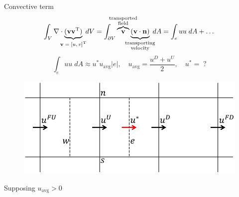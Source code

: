 \documentclass{beamer}
\begin{document}
\begin{frame}{Convective term}
\vspace{-0.5cm}
\begin{equation*}
	\int_V \nabla \cdot \underbrace{(\mathbf{v} 
	\mathbf{v}^\mathrm{T})}_{\substack{\text{\makebox[0pt]{$\mathbf{v} = 
	[u,v]^\mathrm{T}$}}}} \; dV = \int_{\partial V} 
	\overbrace{\mathbf{v}}^{\substack{\text{\makebox[0pt]{transported}} 
	\\ \text{\makebox[0pt]{field}}}} \underbrace{(\mathbf{v} \cdot 
	\mathbf{n})}_{\substack{\text{\makebox[0pt]{transporting}} \\
	\text{\makebox[0pt]{velocity}}}} \; dA = \int_e uu \; dA + \dots
\end{equation*}
\begin{equation*}
\int_e uu \; dA \approx u^* u_\text{avg} |e|, \quad 
u_\text{avg} = \frac{u^D + u^U}{2}, \quad u^* = \; ?
\end{equation*}
\begin{minipage}[t]{0.79\textwidth}
\begin{figure}
	\centering
	\includegraphics[height=0.4\textheight]{trecelle_faces.pdf}
\end{figure}
\end{minipage}
\begin{minipage}[t]{0.19\textwidth}
	\vspace*{1cm}
	Supposing $u_\text{avg} > 0$
\end{minipage}
\end{frame}
\end{document}
